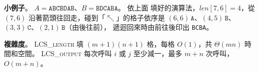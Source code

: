 \begin{pastsoln}
\textbf{小例子}。 $A = \mathtt{ABCBDAB}$、$B = \mathtt{BDCABA}$。 依上面
填好的演算法，$len[7, 6] = 4$，從 $(7, 6)$ 沿著箭頭往回走，碰到「$\nwarrow$」的格子依序是
$(6,6)\,\mathtt{A}$、$(4,5)\,\mathtt{B}$、$(3,3)\,\mathtt{C}$、$(2,1)\,\mathtt{B}$（由後往前），
遞迴回來時由前往後印出 \texttt{BCBA}。

\textbf{複雜度}。 \textsc{LCS\_length} 填 $(m+1)(n+1)$ 格，每格 $O(1)$，共 $\Theta(mn)$ 時間和空間。
\textsc{LCS\_output} 每次呼叫 $i$ 或 $j$ 至少減一，最多 $m + n$ 次呼叫，$O(m + n)$。
\end{pastsoln}
